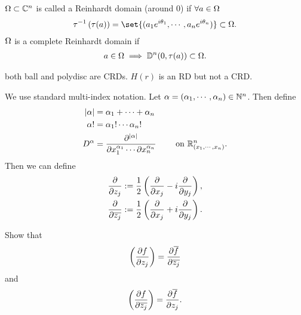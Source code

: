 \begin{definition}
    $\Omega \subset \mathbb{C}^n$ is called a Reinhardt domain (around $0$) if $\forall a \in \Omega$
    \begin{align*}
        \tau^{-1} \br{\tau (a)} = \set{ (a_1 e^{i \theta_1} , \cdots, a_n e^{i \theta_n})} \subset \om.
    \end{align*}
    $\Omega$ is a complete Reinhardt domain if
    \begin{align*}
        a \in \Omega \implies \mathbb{D}^n(0, \tau(a) ) \subset \Omega.
    \end{align*}
\end{definition}

\begin{example}
    both ball and polydisc are CRDs. $H(r)$ is an RD but not a CRD.
\end{example}

\begin{note}
    We use standard multi-index notation. Let $\alpha = (\alpha_1 , \cdots, \alpha_n) \in \mathbb{N}^n$. Then define
    \begin{align*}
        |\alpha| &= \alpha_1 + \cdots + \alpha_n\\
        \alpha! &= \alpha_1! \cdots \alpha_n!\\
        D^\alpha &= \frac{\partial^{|\alpha|}}{\partial x_1^{\alpha_1} \cdots \partial x_n^{\alpha_n}} \quad \quad \text{ on } \mathbb{R}^n_{(x_1 , \cdots, x_n)}.
    \end{align*}
    Then we can define
    \begin{align*}
        \frac{\partial }{\partial z_j} &:= \frac{1}{2} \left(  \frac{\partial}{\partial x_j} - i \frac{\partial}{\partial y_j}  \right),\\
        \frac{\partial }{\partial \overline{z_j}} &:= \frac{1}{2} \left(  \frac{\partial}{\partial x_j} + i \frac{\partial}{\partial y_j}  \right).
    \end{align*}
\end{note}

\begin{exercise}
    Show that
    \begin{align*}
        \left(  \frac{\partial f}{\partial z_j}  \right) = \frac{\partial \overline{f}}{\partial \overline{z_j}}
    \end{align*}
    and
    \begin{align*}
        \left(  \frac{\partial f}{\partial \overline{z_j}}  \right) = \frac{\partial \overline{f}}{\partial z_j}.
    \end{align*}
\end{exercise}

